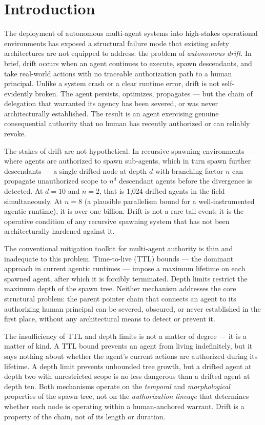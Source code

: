 \section{Introduction}
\label{sec:introduction}

The deployment of autonomous multi-agent systems into high-stakes operational environments has exposed a structural failure mode that existing safety architectures are not equipped to address: the problem of \textit{autonomous drift}. In brief, drift occurs when an agent continues to execute, spawn descendants, and take real-world actions with no traceable authorization path to a human principal. Unlike a system crash or a clear runtime error, drift is not self-evidently broken. The agent persists, optimizes, propagates — but the chain of delegation that warranted its agency has been severed, or was never architecturally established. The result is an agent exercising genuine consequential authority that no human has recently authorized or can reliably revoke.

The stakes of drift are not hypothetical. In recursive spawning environments — where agents are authorized to spawn sub-agents, which in turn spawn further descendants — a single drifted node at depth $d$ with branching factor $n$ can propagate unauthorized scope to $n^d$ descendant agents before the divergence is detected. At $d=10$ and $n=2$, that is 1,024 drifted agents in the field simultaneously. At $n=8$ (a plausible parallelism bound for a well-instrumented agentic runtime), it is over one billion. Drift is not a rare tail event; it is the operative condition of any recursive spawning system that has not been architecturally hardened against it.

The conventional mitigation toolkit for multi-agent authority is thin and inadequate to this problem. Time-to-live (TTL) bounds — the dominant approach in current agentic runtimes — impose a maximum lifetime on each spawned agent, after which it is forcibly terminated. Depth limits restrict the maximum depth of the spawn tree. Neither mechanism addresses the core structural problem: the parent pointer chain that connects an agent to its authorizing human principal can be severed, obscured, or never established in the first place, without any architectural means to detect or prevent it.

The insufficiency of TTL and depth limits is not a matter of degree — it is a matter of kind. A TTL bound prevents an agent from living indefinitely, but it says nothing about whether the agent's current actions are authorized during its lifetime. A depth limit prevents unbounded tree growth, but a drifted agent at depth two with unrestricted scope is no less dangerous than a drifted agent at depth ten. Both mechanisms operate on the \textit{temporal} and \textit{morphological} properties of the spawn tree, not on the \textit{authorization lineage} that determines whether each node is operating within a human-anchored warrant. Drift is a property of the chain, not of its length or duration.

